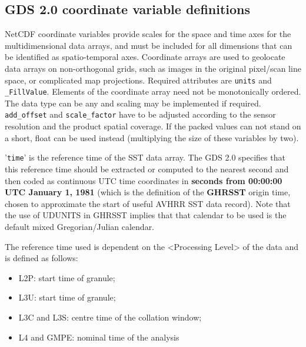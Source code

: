 \subsection{GDS 2.0 coordinate variable definitions}
NetCDF coordinate variables provide scales for the space and time axes for the multidimensional data
arrays, and must be included for all dimensions that can be identified as spatio-temporal axes.
Coordinate arrays are used to geolocate data arrays on non-orthogonal grids, such as images in the
original pixel/scan line space, or complicated map projections. Required attributes are \texttt{units} and
\texttt{\_FillValue}. Elements of the coordinate array need not be monotonically ordered. The data type
can be any and scaling may be implemented if required. \texttt{add\_offset} and \texttt{scale\_factor} have to
be adjusted according to the sensor resolution and the product spatial coverage. If the packed values
can not stand on a short, float can be used instead (multiplying the size of these variables by two).
\par \vspace{0.1in}

'\texttt{time}' is the reference time of the SST data array. The GDS 2.0 specifies that this reference time
should be extracted or computed to the nearest second and then coded as continuous UTC time
coordinates in \textbf{seconds from 00:00:00 UTC January 1, 1981} (which is the definition of the \textbf{GHRSST}
origin time, chosen to approximate the start of useful AVHRR SST data record). Note that the use of
UDUNITS in GHRSST implies that that calendar to be used is the default mixed Gregorian/Julian
calendar.
\par \vspace{0.1in}

The reference time used is dependent on the <Processing Level> of the data and is defined as
follows:
\par \vspace{0.1in}
\begin{itemize}
    \item L2P: start time of granule;
    \item L3U: start time of granule;
    \item L3C and L3S: centre time of the collation window;
    \item L4 and GMPE: nominal time of the analysis
\end{itemize}
\par \vspace{0.1in}

